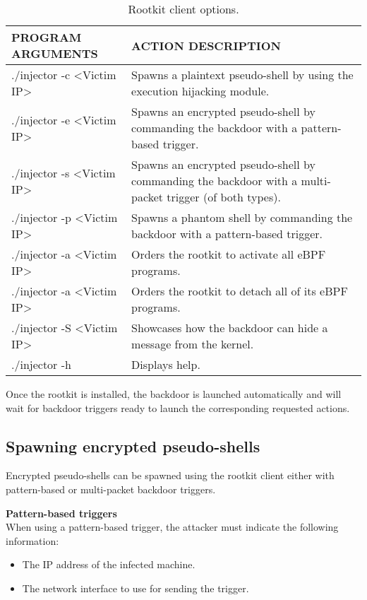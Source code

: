 \begin{table}[htbp]
\begin{tabular}{|>{\centering\arraybackslash}p{5cm}|>{\centering\arraybackslash}p{9.5cm}|}
\hline
\textbf{PROGRAM ARGUMENTS} & \textbf{ACTION DESCRIPTION}\\
\hline
\hline
./injector -c <Victim IP> & Spawns a plaintext pseudo-shell by using the execution hijacking module.\\
\hline
./injector -e <Victim IP> & Spawns an encrypted pseudo-shell by commanding the backdoor with a pattern-based trigger.\\
\hline
./injector -s <Victim IP> & Spawns an encrypted pseudo-shell by commanding the backdoor with a multi-packet trigger (of both types).\\
\hline
./injector -p <Victim IP> & Spawns a phantom shell by commanding the backdoor with a pattern-based trigger.\\
\hline
./injector -a <Victim IP> & Orders the rootkit to activate all eBPF programs.\\
\hline
./injector -a <Victim IP> & Orders the rootkit to detach all of its eBPF programs.\\
\hline
./injector -S <Victim IP> & Showcases how the backdoor can hide a message from the kernel.\\
\hline
./injector -h & Displays help.\\
\hline
\end{tabular}
\caption{Rootkit client options.}
\label{table:rootkit_client_actions}
\end{table}

Once the rootkit is installed, the backdoor is launched automatically and will wait for backdoor triggers ready to launch the corresponding requested actions.

\subsection{Spawning encrypted pseudo-shells}
Encrypted pseudo-shells can be spawned using the rootkit client either with pattern-based or multi-packet backdoor triggers.

\textbf{Pattern-based triggers}\\
When using a pattern-based trigger, the attacker must indicate the following information:
\begin{itemize}
\item The IP address of the infected machine.
\item The network interface to use for sending the trigger.
\end{itemize}

